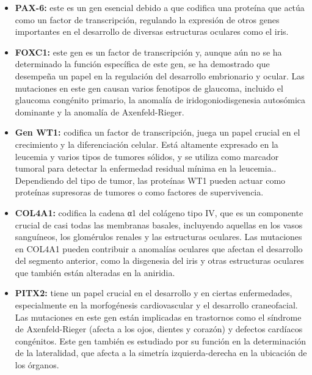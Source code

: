 \begin{itemize}
	\item \textbf{PAX-6:} este es un gen esencial debido a que codifica una proteína que actúa como un factor de transcripción, regulando la expresión de otros genes importantes en el desarrollo de diversas estructuras oculares como el iris.
	\item \textbf{FOXC1:} este gen es un factor de transcripción y, aunque aún no se ha determinado la función específica de este gen, se ha demostrado que desempeña un papel en la regulación del desarrollo embrionario y ocular. Las mutaciones en este gen causan varios fenotipos de glaucoma, incluido el glaucoma congénito primario, la anomalía de iridogoniodisgenesia autosómica dominante y la anomalía de Axenfeld-Rieger.
	\item \textbf{Gen WT1:} codifica un factor de transcripción, juega un papel crucial en el crecimiento y la diferenciación celular. Está altamente expresado en la leucemia y varios tipos de tumores sólidos, y se utiliza como marcador tumoral para detectar la enfermedad residual mínima en la leucemia.\cite{10.1093/jjco/hyp194}. Dependiendo del tipo de tumor, las proteínas WT1 pueden actuar como proteínas supresoras de tumores o como factores de supervivencia.\cite{SCHARNHORST2001141}
	\item \textbf{COL4A1:} codifica la cadena α1 del colágeno tipo IV, que es un componente crucial de casi todas las membranas basales, incluyendo aquellas en los vasos sanguíneos, los glomérulos renales y las estructuras oculares.\cite{Vahedi2011} Las mutaciones en COL4A1 pueden contribuir a anomalías oculares que afectan el desarrollo del segmento anterior, como la disgenesia del iris y otras estructuras oculares que también están alteradas en la aniridia.\cite{Reis2011}	
	\item \textbf{PITX2:} tiene un papel crucial en el desarrollo y en ciertas enfermedades, especialmente en la morfogénesis cardiovascular y el desarrollo craneofacial. Las mutaciones en este gen están implicadas en trastornos como el síndrome de Axenfeld-Rieger (afecta a los ojos, dientes y corazón) y defectos cardíacos congénitos. Este gen también es estudiado por su función en la determinación de la lateralidad, que afecta a la simetría izquierda-derecha en la ubicación de los órganos. \cite{10.1093/hmg/ddy074}
\end{itemize}


